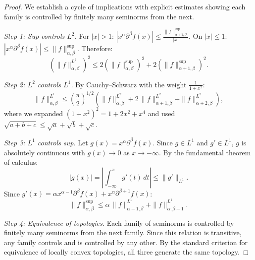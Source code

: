 \documentclass{techbrief}
\begin{document}
	\begin{proof}
		We establish a cycle of implications with explicit estimates showing each family is controlled by finitely many seminorms from the next.
		
		\emph{Step 1: Sup controls $L^2$.} For $|x| > 1$: $|x^\alpha \partial^\beta f(x)| \leq \frac{\|f\|_{\alpha+1,\beta}^{\sup}}{|x|}$. On $|x| \leq 1$: $|x^\alpha \partial^\beta f(x)| \leq \|f\|_{\alpha,\beta}^{\sup}$. Therefore:
		\begin{equation}
			\left(\|f\|_{\alpha,\beta}^{L^2}\right)^2 \leq 2\left(\|f\|_{\alpha,\beta}^{\sup}\right)^2 + 2\left(\|f\|_{\alpha+1,\beta}^{\sup}\right)^2.
		\end{equation}
		
		\emph{Step 2: $L^2$ controls $L^1$.} By Cauchy--Schwarz with the weight $\frac{1}{1+x^2}$:
		\begin{equation}
			\|f\|_{\alpha,\beta}^{L^1} \leq \left(\frac{\pi}{2}\right)^{1/2} \left( \|f\|_{\alpha,\beta}^{L^2} + 2\,\|f\|_{\alpha+1,\beta}^{L^2} + \|f\|_{\alpha+2,\beta}^{L^2} \right),
		\end{equation}
		where we expanded $(1+x^2)^2 = 1 + 2x^2 + x^4$ and used $\sqrt{a+b+c} \leq \sqrt{a}+\sqrt{b}+\sqrt{c}$.
		
		\emph{Step 3: $L^1$ controls sup.} Let $g(x) = x^\alpha \partial^\beta f(x)$. Since $g \in L^1$ and $g' \in L^1$, $g$ is absolutely continuous with $g(x) \to 0$ as $x \to -\infty$. By the fundamental theorem of calculus:
		\begin{equation}
			|g(x)| = \left| \int_{-\infty}^{x} g'(t)\, dt \right| \leq \|g'\|_{L^1}.
		\end{equation}
		Since $g'(x) = \alpha x^{\alpha-1} \partial^\beta f(x) + x^\alpha \partial^{\beta+1} f(x)$:
		\begin{equation}
			\|f\|_{\alpha,\beta}^{\sup} \leq \alpha\,\|f\|_{\alpha-1,\beta}^{L^1} + \|f\|_{\alpha,\beta+1}^{L^1}.
		\end{equation}
		
		\emph{Step 4: Equivalence of topologies.} Each family of seminorms is controlled by finitely many seminorms from the next family. Since this relation is transitive, any family controls and is controlled by any other. By the standard criterion for equivalence of locally convex topologies, all three generate the same topology.
	\end{proof}
	
\end{document}
